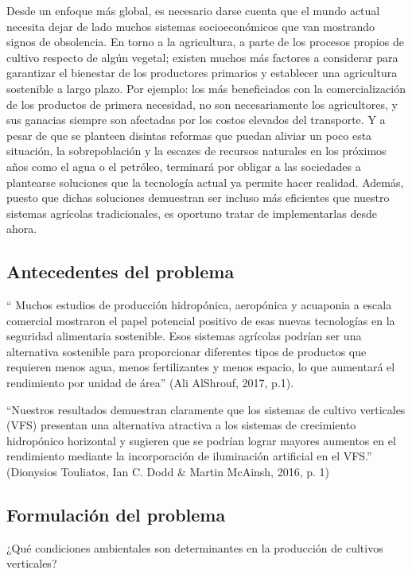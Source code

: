 \documentclass{report}
\begin{document}
Desde un enfoque más global, es necesario darse cuenta que el mundo actual
necesita dejar de lado muchos sistemas socioeconómicos que van mostrando signos
de obsolencia. En torno a la agricultura, a parte de los procesos propios de
cultivo respecto de algún vegetal; existen muchos más factores a considerar para
garantizar el bienestar de los productores primarios y establecer una
agricultura sostenible a largo plazo. Por ejemplo: los más beneficiados con la
comercialización de los productos de primera necesidad, no son necesariamente
los agricultores, y sus ganacias siempre son afectadas por los costos elevados
del transporte. Y a pesar de que se planteen disintas reformas que puedan
aliviar un poco esta situación, la sobrepoblación y la escazes de recursos
naturales en los próximos años como el agua o el petróleo, terminará por obligar
a las sociedades a plantearse soluciones que la tecnología actual ya permite
hacer realidad. Además, puesto que dichas soluciones demuestran ser incluso más
eficientes que nuestro sistemas agrícolas tradicionales, es oportuno tratar de
implementarlas desde ahora.
\subsection{Antecedentes del problema}

`` Muchos estudios de producción hidropónica, aeropónica y acuaponia a escala
comercial mostraron el papel potencial positivo de esas nuevas tecnologías en la
seguridad alimentaria sostenible. Esos sistemas agrícolas podrían ser una
alternativa sostenible para proporcionar diferentes tipos de productos que
requieren menos agua, menos fertilizantes y menos espacio, lo que aumentará el
rendimiento por unidad de área'' (Ali AlShrouf, 2017, p.1).

``Nuestros resultados demuestran claramente que los sistemas de cultivo
verticales (VFS) presentan una alternativa atractiva a los sistemas de
crecimiento hidropónico horizontal y sugieren que se podrían lograr mayores
aumentos en el rendimiento mediante la incorporación de iluminación artificial
en el VFS.'' (Dionysios Touliatos, Ian C. Dodd & Martin McAinsh, 2016, p. 1)

\subsection{Formulación del problema}

¿Qué condiciones ambientales son determinantes en la producción de
cultivos verticales?
\end{document}
